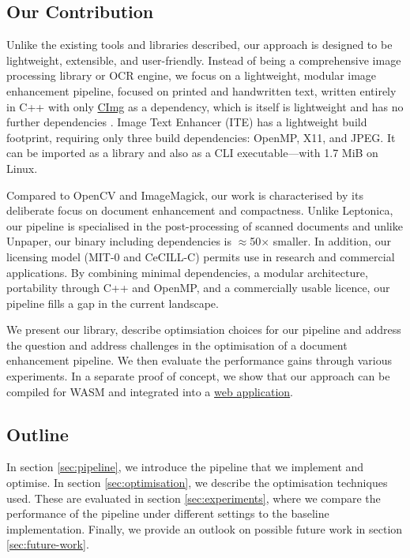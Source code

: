 \documentclass[sigconf]{acmart}
\begin{document}
\subsection{Our Contribution}
\label{sec:our-contribution}


Unlike the existing tools and libraries described, our approach is designed to be lightweight, extensible, and user-friendly. Instead of being a comprehensive image processing library or OCR engine, we focus on a lightweight, modular image enhancement pipeline, focused on printed and handwritten text, written entirely in C++ with only \href{https://www.cimg.eu/}{CImg} as a dependency, which is itself is lightweight and has no further dependencies \cite{cimg}. Image Text Enhancer (ITE) has a lightweight build footprint, requiring only three build dependencies: OpenMP, X11, and JPEG. It can be imported as a library and also as a CLI executable---with 1.7 MiB on Linux.

Compared to OpenCV and ImageMagick, our work is characterised by its deliberate focus on document enhancement and compactness. Unlike Leptonica, our pipeline is specialised in the post-processing of scanned documents and unlike Unpaper, our binary including dependencies is $\approx$50$\times$ smaller.
In addition, our licensing model (MIT-0 and CeCILL-C) permits use in research and commercial applications. By combining minimal dependencies, a modular architecture, portability through C++ and OpenMP, and a commercially usable licence, our pipeline fills a gap in the current landscape.

We present our library, describe optimsiation choices for our pipeline and address the question and address challenges in the optimisation of a document enhancement pipeline. We then evaluate the performance gains through various experiments. In a separate proof of concept, we show that our approach can be compiled for WASM and integrated into a \underline{\href{https://ite.daniel-motz.de}{web application}}. %

\subsection{Outline}
\label{sec:outline}

In section \ref{sec:pipeline}, we introduce the pipeline that we implement and optimise. In section \ref{sec:optimisation}, we describe the optimisation techniques used. These are evaluated in section \ref{sec:experiments}, where we compare the performance of the pipeline under different settings to the baseline implementation. Finally, we provide an outlook on possible future work in section \ref{sec:future-work}. 
\end{document}
